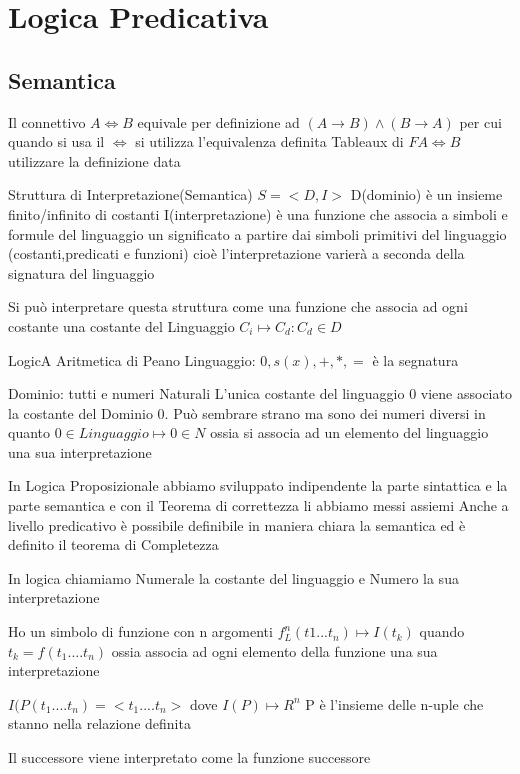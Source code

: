 \chapter{Logica Predicativa}

\section{Semantica}
Il connettivo $A \iff B$ equivale per definizione ad $(A \rightarrow B) \land (B \rightarrow A)$ per cui quando si usa il $\iff$ si utilizza l'equivalenza
definita
Tableaux di $F A \iff B$ utilizzare la definizione data 

Struttura di Interpretazione(Semantica) %
$S = <D,I> $
D(dominio) è un insieme finito/infinito di costanti
I(interpretazione) è una funzione che associa a simboli e formule del linguaggio un significato a partire dai simboli primitivi del linguaggio
(costanti,predicati e funzioni) cioè l'interpretazione varierà a seconda della signatura del linguaggio

Si può interpretare questa struttura come una funzione che associa ad ogni costante una costante del Linguaggio 
$C_i \mapsto C_d : C_d \in D$

LogicA Aritmetica di Peano
Linguaggio: $0,s(x),+,*,=$ è la segnatura

Dominio: tutti e numeri Naturali
L'unica costante del linguaggio $0$ viene associato la costante del Dominio $0$. Può sembrare strano ma sono dei numeri diversi in quanto 
$0 \in Linguaggio \mapsto 0 \in N$ ossia si associa ad un elemento del linguaggio una sua interpretazione


In Logica Proposizionale abbiamo sviluppato indipendente la parte sintattica e la parte semantica e con il Teorema di correttezza li abbiamo messi assiemi
Anche a livello predicativo è possibile definibile in maniera chiara la semantica ed è definito il teorema di Completezza

In logica chiamiamo Numerale la costante del linguaggio e Numero la sua interpretazione

Ho un simbolo di funzione con n argomenti $f ^ n _L(t1...t_n) \mapsto I(t_k)$ quando $t_k = f(t_1....t_n)$ ossia associa ad ogni elemento della funzione una sua interpretazione

$I(P(t_1....t_n) = <t_1....t_n> $ dove $I(P) \mapsto R ^n$ P è l'insieme delle n-uple che stanno nella relazione definita

Il successore viene interpretato come la funzione successore

